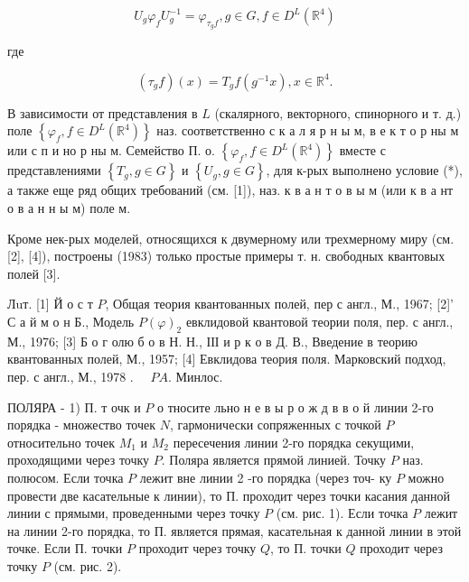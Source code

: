 \documentclass[10pt]{article}
\begin{document}
\[

U_{g} \varphi_{f} U_{g}^{-1}=\varphi_{\tau_{g} f}, g \in G, f \in D^{L}\left(\mathbb{R}^{4}\right)

\]



где



\[

\left(\tau_{g} f\right)(x)=T_{g} f\left(g^{-1} x\right), x \in \mathbb{R}^{4} .

\]



В зависимости от представления в $L$ (скалярного, векторного, спинорного и т. д.) поле $\left\{\varphi_{f}, f \in D^{L}\left(\mathbb{R}^{4}\right)\right\}$ наз. соответственно с к а л я р н ы м, в е к т о р ны м или с п и но р ны м. Семейство П. о. $\left\{\varphi_{f}, f \in D^{L}\left(\mathbb{R}^{4}\right)\right\}$ вместе с представлениями $\left\{T_{g}, g \in G\right\}$ и $\left\{U_{g}, g \in G\right\}$, для к-рых выполнено условие (*), а также еще ряд общих требований (см. [1]), наз. к в а н т о в ы м (или к в а нт о в а н н ы м) поле м.



Кроме нек-рых моделей, относящихся к двумерному или трехмерному миру (см. [2], [4]), построены (1983) только простые примеры т. н. свободных квантовых полей [3].



Лuт. [1] Й о с т $P$, Общая теория квантованных полей, пер с англ., М., 1967; [2]' С а й м о н Б., Модель $P(\varphi)_{2}$ евклидовой квантовой теории поля, пер. с англ., М., 1976; [3] Б о г олю б о в Н. Н., ІІІ и р к о в Д. В., Введение в теорию квантованных полей, М., 1957; [4] Евклидова теория поля. Марковский подход, пер. с англ., М., 1978 . $\quad P A$. Минлос.



ПОЛЯРА - 1) П. т очк и $P$ о тносите льно н е в ы $р$ о ж д в в о й линии 2-го порядка - множество точек $N$, гармонически сопряженных с точкой $P$ относительно точек $M_{1}$ и $M_{2}$ пересечения линии 2-го порядка секущими, проходящими через точку $P$. Поляра является прямой линией. Точку $P$ наз. полюсом. Если точка $P$ лежит вне линии 2 -го порядка (через точ- ку $P$ можно провести две касательные к линии), то П. проходит через точки касания данной линии с прямыми, проведенными через точку $P$ (см. рис. 1). Если точка $P$ лежит на линии 2-го порядка, то П. является прямая, касательная к данной линии в этой точке. Если П. точки $P$ проходит через точку $Q$, то П. точки $Q$ проходит через точку $P$ (см. рис. 2).
\end{document}
